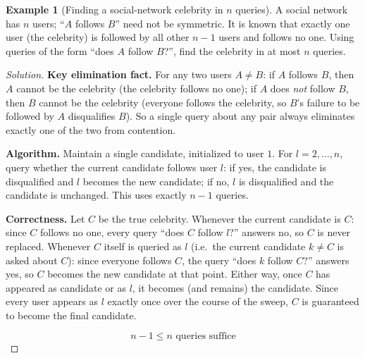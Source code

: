 \documentclass[11pt]{article}
\theoremstyle{definition}
\newtheorem{example}{Example}[section]
\begin{document}
\begin{example}[Finding a social-network celebrity in $n$ queries]
A social network has $n$ users; ``$A$ follows $B$'' need not be symmetric. It is known that exactly one user (the celebrity) is followed by all other $n-1$ users and follows no one. Using queries of the form ``does $A$ follow $B$?'', find the celebrity in at most $n$ queries.
\end{example}
\begin{proof}[Solution]
\textbf{Key elimination fact.} For any two users $A\ne B$: if $A$ follows $B$, then $A$ cannot be the celebrity (the celebrity follows no one); if $A$ does \emph{not} follow $B$, then $B$ cannot be the celebrity (everyone follows the celebrity, so $B$'s failure to be followed by $A$ disqualifies $B$). So a single query about any pair always eliminates exactly one of the two from contention.

\textbf{Algorithm.} Maintain a single candidate, initialized to user $1$. For $l=2,\dots,n$, query whether the current candidate follows user $l$: if yes, the candidate is disqualified and $l$ becomes the new candidate; if no, $l$ is disqualified and the candidate is unchanged. This uses exactly $n-1$ queries.

\textbf{Correctness.} Let $C$ be the true celebrity. Whenever the current candidate is $C$: since $C$ follows no one, every query ``does $C$ follow $l$?'' answers no, so $C$ is never replaced. Whenever $C$ itself is queried as $l$ (i.e.\ the current candidate $k\ne C$ is asked about $C$): since everyone follows $C$, the query ``does $k$ follow $C$?'' answers yes, so $C$ becomes the new candidate at that point. Either way, once $C$ has appeared as candidate or as $l$, it becomes (and remains) the candidate. Since every user appears as $l$ exactly once over the course of the sweep, $C$ is guaranteed to become the final candidate.

\[
\boxed{n-1\le n\text{ queries suffice}}
\]
\end{proof}
\end{document}
